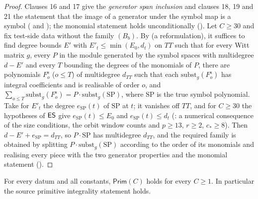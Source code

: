 \begin{proof}
Clauses 16 and 17 give the \emph{generator span inclusion} and clauses 18, 19 and 21 the statement that the image of a
generator under the symbol map is a symbol
( and );
the monomial statement holds unconditionally (). Let $C\ge30$
and fix test-side data without the family $(B_b)$. By 
(a reformulation), it suffices to find degree bounds $E'$ with $E'_t\le\min(E_0,d_t)$ on $TT$ such that for every Witt
matrix $g$, every $P$ in the module generated by the symbol spaces with multidegree $d-E'$ and every $T$ bounding the
degrees of the monomials of $P$, there are polynomials $F^{\mathrm s}_o$ ($o\le T$) of multidegree $d_{TT}$ such that each
$\mathrm{subst}_g(F^{\mathrm s}_o)$ has integral coefficients and is realisable of order $o$, and
$\sum_{o\le T}\mathrm{subst}_g(F^{\mathrm s}_o)=P\cdot\mathrm{subst}_g(\mathrm{SP})$, where $\mathrm{SP}$ is the true symbol
polynomial. Take for $E'_t$ the degree $e_{\mathrm{SP}}(t)$ of $\mathrm{SP}$ at $t$; it vanishes off $TT$, and for $C\ge30$ the
hypotheses of $\mathsf{ES}$ give $e_{\mathrm{SP}}(t)\le E_0$ and $e_{\mathrm{SP}}(t)\le d_t$
(: a numerical consequence of the size conditions, the orbit window counts and
$p\ge13$, $r\ge2$, $c_*\ge8$). Then $d-E'+e_{\mathrm{SP}}=d_{TT}$, so $P\cdot\mathrm{SP}$ has multidegree $d_{TT}$, and the
required family is obtained by splitting $P\cdot\mathrm{subst}_g(\mathrm{SP})$ according to the order of its monomials and
realising every piece with the two generator properties and the monomial statement
().
\end{proof}

\begin{proposition}\label{pf:linkG:prim}
For every datum and all constants, $\mathsf{Prim}(C)$ holds for every $C\ge1$. In particular the source primitive
integrality statement holds.
\end{proposition}

